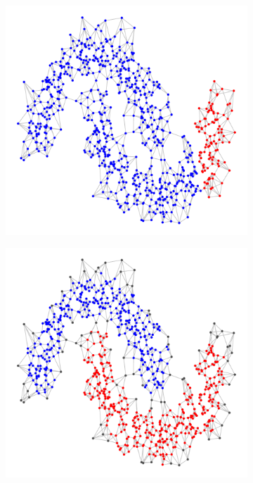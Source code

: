 \documentclass{article}
\newcommand{\1}{\mathbf{1}}
\theoremstyle{aldenthm}
\theoremstyle{aldenrmrk}
\begin{document}
\begin{figure}
\begin{adjustbox}{minipage=\linewidth,scale=0.8}
\begin{subfigure}{.24\linewidth}
		\caption{}
	\end{subfigure}
	\begin{subfigure}{.24\linewidth}
		\includegraphics[width=\linewidth]{example2plots/row3_conductance_cluster}
		\caption{}
	\end{subfigure}
	\begin{subfigure}{.24\linewidth}
		\includegraphics[width=\linewidth]{example2plots/row3_density_cluster}
		\caption{}
	\end{subfigure}
	

\end{adjustbox}
\end{figure}
\end{document}
